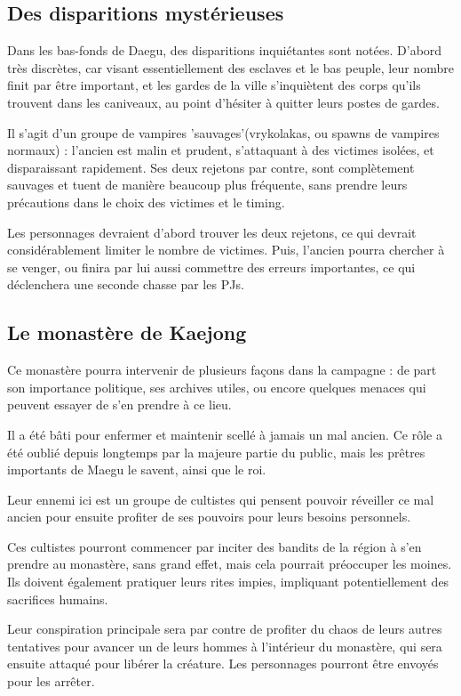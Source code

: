 \documentclass[10pt,a4paper]{book}
\begin{document}
\subsection{Des disparitions mystérieuses}
Dans les bas-fonds de Daegu, des disparitions inquiétantes sont notées. D'abord très discrètes, car visant essentiellement des esclaves et le bas peuple, leur nombre finit par être important, et les gardes de la ville s'inquiètent des corps qu'ils trouvent dans les caniveaux, au point d'hésiter à quitter leurs postes de gardes.

Il s'agit d'un groupe de vampires 'sauvages'(vrykolakas, ou spawns de vampires normaux) : l'ancien est malin et prudent, s'attaquant à des victimes isolées, et disparaissant rapidement. Ses deux rejetons par contre, sont complètement sauvages et tuent de manière beaucoup plus fréquente, sans prendre leurs précautions dans le choix des victimes et le timing.

Les personnages devraient d'abord trouver les deux rejetons, ce qui devrait considérablement limiter le nombre de victimes. Puis, l'ancien pourra chercher à se venger, ou finira par lui aussi commettre des erreurs importantes, ce qui déclenchera une seconde chasse par les PJs.


\subsection{Le monastère de Kaejong}
Ce monastère pourra intervenir de plusieurs façons dans la campagne :
de part son importance politique, ses archives utiles, ou encore quelques menaces qui peuvent essayer de s'en prendre à ce lieu.

Il a été bâti pour enfermer et maintenir scellé à jamais un mal ancien. Ce rôle a été oublié depuis longtemps par la majeure partie du public, mais les prêtres importants de Maegu le savent, ainsi que le roi. 

Leur ennemi ici est un groupe de cultistes qui pensent pouvoir réveiller ce mal ancien pour ensuite profiter de ses pouvoirs pour leurs besoins personnels.

Ces cultistes pourront commencer par inciter des bandits de la région à s'en prendre au monastère, sans grand effet, mais cela pourrait préoccuper les moines. Ils doivent également pratiquer leurs rites impies, impliquant potentiellement des sacrifices humains.

Leur conspiration principale sera par contre de profiter du chaos de leurs autres tentatives pour avancer un de leurs hommes à l'intérieur du monastère, qui sera ensuite attaqué pour libérer la créature. Les personnages pourront être envoyés pour les arrêter.
\end{document}
